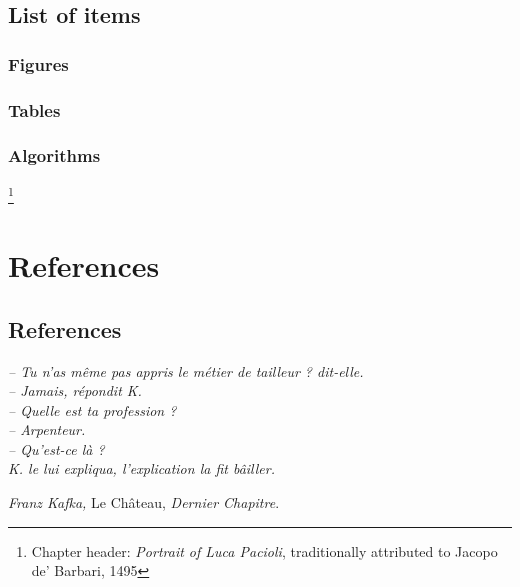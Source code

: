 \documentclass[12pt,fleqn]{book} %
\newcommand\blfootnote[1]{%
  \begingroup
  \renewcommand\thefootnote{}\footnote{#1}%
  \addtocounter{footnote}{-1}%
  \endgroup
}
\begin{document}
{\chapter*{List of items}
\section*{Figures}
\let\clearpage\relax
\section*{Tables}
\section*{Algorithms}
\makeatother
\endgroup
\blfootnote{Chapter header: \emph{Portrait of Luca Pacioli}, traditionally attributed to Jacopo de' Barbari, 1495}



\cleardoublepage %

\pagestyle{fancy} %

\clearpage




\part{References}
\chapter*{References}

\vspace{-3cm}
\emph{– Tu n’as même pas appris le métier de tailleur ? dit-elle.\\
– Jamais, répondit K.\\
– Quelle est ta profession ?\\
– Arpenteur.\\
– Qu’est-ce là ? \\
K. le lui expliqua, l’explication la fit bâiller. } \\ \vspace{-1.2cm}
\begin{flushright}
\emph{Franz Kafka,} Le Château, \emph{Dernier Chapitre}.
\end{flushright}
\begin{refcontext}[sorting=nyt]
\printbibliography[heading=bibempty]
\end{refcontext}
\end{document}
